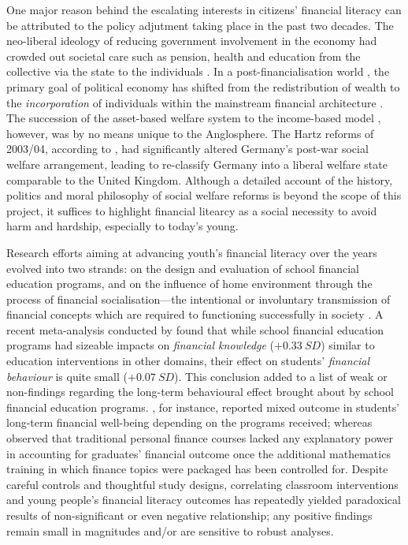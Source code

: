 \documentclass[a4paper,11pt,UKenglish,twoside,openright]{report}\usepackage[]{graphicx}\usepackage[]{color}
\begin{document}
One major reason behind the escalating interests in citizens' financial literacy can be attributed to the policy adjutment taking place in the past two decades. The neo-liberal ideology of reducing government involvement in the economy had crowded out societal care such as pension, health and education from the collective via the state to the individuals \parencite{gilbert:2002}. In a post-financialisation world \parencite{krippner:2005}, the primary goal of political economy has shifted from the redistribution of wealth to the \emph{incorporation} of individuals within the mainstream financial architecture \parencite{regan:2003}. The succession of the asset-based welfare system to the income-based model \parencite{finlayson:2009}, however, was by no means unique to the Anglosphere. The Hartz reforms of 2003/04, according to \textcite{seeleibkaiser:2016}, had significantly altered Germany's post-war social welfare arrangement, leading \textcite{ferragina:2015} to re-classify Germany into a liberal welfare state comparable to the United Kingdom. Although a detailed account of the history, politics and moral philosophy of social welfare reforms is beyond the scope of this project, it suffices to highlight financial litearcy as a social necessity to avoid harm and hardship, especially to today's young.

Research efforts aiming at advancing youth's financial literacy over the years evolved into two strands: on the design and evaluation of school financial education programs, and on the influence of home environment through the process of financial socialisation---the intentional or involuntary transmission of financial concepts which are required to functioning successfully in society \parencite{bowen:2002}. A recent meta-analysis conducted by \textcite{kaiser:2020} found that while school financial education programs had sizeable impacts on \emph{financial knowledge} ($+0.33\ SD$) similar to education interventions in other domains, their effect on students' \emph{financial behaviour} is quite small ($+0.07\ SD$). This conclusion added to a list of weak or non-findings regarding the long-term behavioural effect brought about by school financial education programs. \textcite{brown:2016}, for instance, reported mixed outcome in students' long-term financial well-being depending on the programs received; whereas \textcite{cole:2016} observed that traditional personal finance courses lacked any explanatory power in accounting for graduates' financial outcome once the additional mathematics training in which finance topics were packaged has been controlled for. Despite careful controls and thoughtful study designs, correlating classroom interventions and young people's financial literacy outcomes has repeatedly yielded paradoxical results of non-significant or even negative relationship; any positive findings remain small in magnitudes and/or are sensitive to robust analyses.
\end{document}
